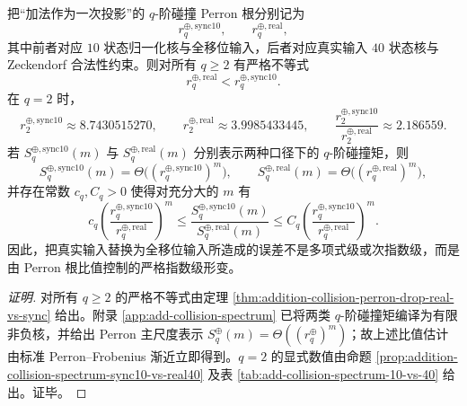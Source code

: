 \begin{conclusion}\label{con:xi-terminal-addition-collision-spectrum-constant-factor-drop}
把“加法作为一次投影”的 \(q\)-阶碰撞 Perron 根分别记为
\[
r_q^{\oplus,\mathrm{sync10}},\qquad
r_q^{\oplus,\mathrm{real}},
\]
其中前者对应 \(10\) 状态归一化核与全移位输入，后者对应真实输入 \(40\) 状态核与 Zeckendorf 合法性约束。则对所有 \(q\ge 2\) 有严格不等式
\[
r_q^{\oplus,\mathrm{real}}<r_q^{\oplus,\mathrm{sync10}}.
\]
在 \(q=2\) 时，
\[
r_2^{\oplus,\mathrm{sync10}}\approx 8.7430515270,\qquad
r_2^{\oplus,\mathrm{real}}\approx 3.9985433445,\qquad
\frac{r_2^{\oplus,\mathrm{sync10}}}{r_2^{\oplus,\mathrm{real}}}\approx 2.186559.
\]
若 \(S_q^{\oplus,\mathrm{sync10}}(m)\) 与 \(S_q^{\oplus,\mathrm{real}}(m)\) 分别表示两种口径下的 \(q\)-阶碰撞矩，则
\[
S_q^{\oplus,\mathrm{sync10}}(m)=\Theta\!\bigl((r_q^{\oplus,\mathrm{sync10}})^m\bigr),\qquad
S_q^{\oplus,\mathrm{real}}(m)=\Theta\!\bigl((r_q^{\oplus,\mathrm{real}})^m\bigr),
\]
并存在常数 \(c_q,C_q>0\) 使得对充分大的 \(m\) 有
\[
c_q\left(\frac{r_q^{\oplus,\mathrm{sync10}}}{r_q^{\oplus,\mathrm{real}}}\right)^m
\le
\frac{S_q^{\oplus,\mathrm{sync10}}(m)}{S_q^{\oplus,\mathrm{real}}(m)}
\le
C_q\left(\frac{r_q^{\oplus,\mathrm{sync10}}}{r_q^{\oplus,\mathrm{real}}}\right)^m.
\]
因此，把真实输入替换为全移位输入所造成的误差不是多项式级或次指数级，而是由 Perron 根比值控制的严格指数级形变。
\end{conclusion}
\begin{proof}[证明]
对所有 \(q\ge 2\) 的严格不等式由定理 \ref{thm:addition-collision-perron-drop-real-vs-sync} 给出。附录 \ref{app:add-collision-spectrum} 已将两类 \(q\)-阶碰撞矩编译为有限非负核，并给出 Perron 主尺度表示 \(S_q^{\oplus}(m)=\Theta((r_q^{\oplus})^m)\)；故上述比值估计由标准 Perron--Frobenius 渐近立即得到。\(q=2\) 的显式数值由命题 \ref{prop:addition-collision-spectrum-sync10-vs-real40} 及表 \ref{tab:add-collision-spectrum-10-vs-40} 给出。证毕。
\end{proof}

